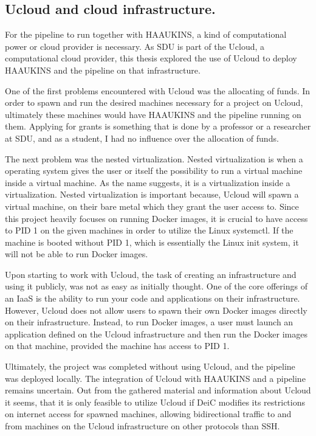 \subsection{\ac{Ucloud} and cloud infrastructure.}
For the pipeline to run together with \ac{HAAUKINS}, a kind of computational power or cloud provider is necessary.
As \ac{SDU} is part of the \ac{Ucloud}\cite{ucloud}, a computational cloud provider, this thesis explored the 
use of \ac{Ucloud} to deploy \ac{HAAUKINS} and the pipeline on that infrastructure.

One of the first problems encountered with \ac{Ucloud} was the allocating of funds. In order 
to spawn and run the desired machines necessary for a project on \ac{Ucloud}, ultimately these machines would have \ac{HAAUKINS} and 
the pipeline running on them.
Applying for grants is something that is done by a professor or a researcher at \ac{SDU}, and as a student,
I had no influence over the allocation of funds.

The next problem was the nested virtualization. Nested virtualization is 
when a operating system gives the user or itself the possibility to run a virtual machine inside a virtual machine. As the 
name suggests, it is a virtualization inside a virtualization.
Nested virtualization is important because, \ac{Ucloud} will spawn 
a virtual machine, on their bare metal which they grant the user access to. Since this project heavily focuses on running Docker images, 
it is crucial to have access to PID 1 on the given machines in order to utilize the Linux systemctl. If the machine is booted without PID 1, 
which is essentially the Linux init system, it will not be able to run Docker images.

Upon starting to work with \ac{Ucloud}, the task of creating an infrastructure and using it publicly, was not as easy as initially thought.
One of the core offerings of an \ac{IaaS} is the ability to run your code and applications on their infrastructure. 
However, Ucloud does not allow users to spawn their own Docker images directly on their infrastructure. Instead, to run Docker images, 
a user must launch an application defined on the Ucloud infrastructure 
and then run the Docker images on that machine, provided the machine has access to PID 1.

Ultimately, the project was completed without using \ac{Ucloud}, and the pipeline was deployed locally. 
The integration of \ac{Ucloud} with \ac{HAAUKINS} and a pipeline remains uncertain. Out from the gathered 
material and information about \ac{Ucloud} it seems, that it is only feasible to utilize \ac{Ucloud} 
if \ac{DeiC} modifies its restrictions on internet access for spawned machines, 
allowing bidirectional traffic to and from machines on the \ac{Ucloud} infrastructure on other protocols than \ac{SSH}.